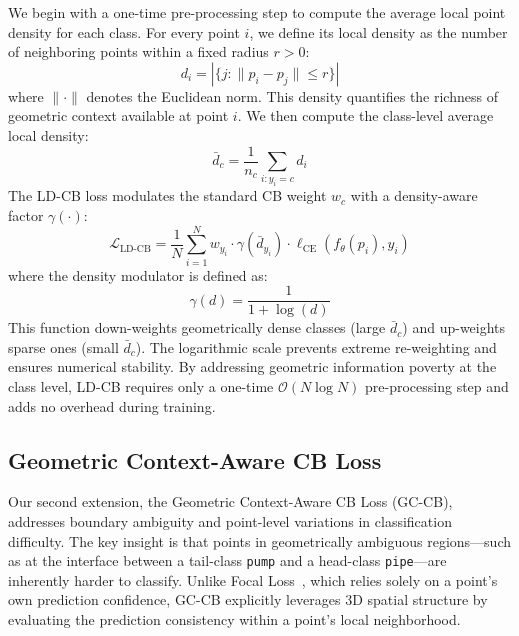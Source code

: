 \documentclass[preprint,12pt]{elsarticle}
\begin{document}
We begin with a one-time pre-processing step to compute the average local point density for each class. For every point \(i\), we define its local density as the number of neighboring points within a fixed radius \(r > 0\):
\begin{equation}
\label{eq:local_density}
d_i = \left|\{j : \|p_i - p_j\| \leq r\}\right|
\end{equation}
where \(\|\cdot\|\) denotes the Euclidean norm. This density quantifies the richness of geometric context available at point \(i\). We then compute the class-level average local density:
\begin{equation}
\label{eq:class_avg_density}
\bar{d}_c = \frac{1}{n_c} \sum_{i: y_i = c} d_i
\end{equation}
The LD-CB loss modulates the standard CB weight \(w_c\) with a density-aware factor \(\gamma(\cdot)\):
\begin{equation}
\label{eq:ld_cb_loss}
\mathcal{L}_{\text{LD-CB}} = \frac{1}{N} \sum_{i=1}^{N} w_{y_i} \cdot \gamma(\bar{d}_{y_i}) \cdot \ell_{\text{CE}}(f_\theta(p_i), y_i)
\end{equation}
where the density modulator is defined as:
\begin{equation}
\label{eq:density_modulator}
\gamma(d) = \frac{1}{1 + \log(d)}
\end{equation}
This function down-weights geometrically dense classes (large \(\bar{d}_c\)) and up-weights sparse ones (small \(\bar{d}_c\)). The logarithmic scale prevents extreme re-weighting and ensures numerical stability. By addressing geometric information poverty at the class level, LD-CB requires only a one-time \(\mathcal{O}(N \log N)\) pre-processing step and adds no overhead during training.

\subsection{Geometric Context-Aware CB Loss}
\label{sec:gc_cb_loss}
Our second extension, the Geometric Context-Aware CB Loss (GC-CB), addresses boundary ambiguity and point-level variations in classification difficulty. The key insight is that points in geometrically ambiguous regions—such as at the interface between a tail-class \texttt{pump} and a head-class \texttt{pipe}—are inherently harder to classify. Unlike Focal Loss~\cite{lin2017focal}, which relies solely on a point's own prediction confidence, GC-CB explicitly leverages 3D spatial structure by evaluating the prediction consistency within a point's local neighborhood.
\end{document}
